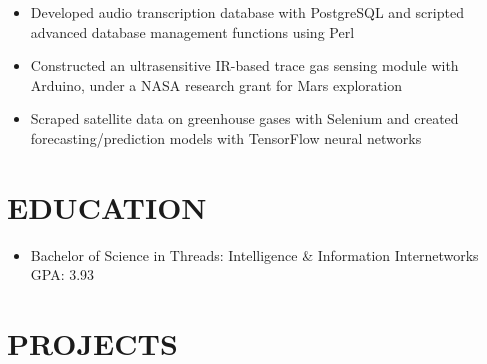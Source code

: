 \documentclass[11pt,letterpaper]{article}
\begin{document}
  \begin{itemize}
    \item{Developed audio transcription database with PostgreSQL and scripted advanced database management functions using Perl}
  \end{itemize}

  \ifoscar
    {\fontsize{12}{12}}

    \begin{itemize}
      \item{Constructed an ultrasensitive IR-based trace gas sensing module with Arduino, under a NASA research grant for Mars exploration}
      \item{Scraped satellite data on greenhouse gases with Selenium and created forecasting/prediction models with TensorFlow neural networks}
    \end{itemize}
  \fi

  \smallskip


  \section*{EDUCATION}

  {\fontsize{12}{12}}

  \begin{itemize}
    \item{
      Bachelor of Science in
      {}
      \textemdash{}
      Threads: Intelligence \& Information Internetworks
      \textemdash{}
      GPA: 3.93
    }

  \end{itemize}

  \smallskip


  \section*{PROJECTS}
\end{document}
